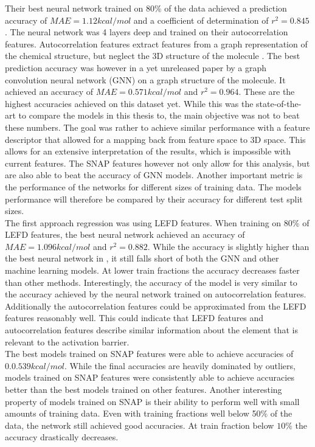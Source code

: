 Their best neural network trained on 80\% of the data achieved a prediction accuracy of $MAE = 1.12 kcal/mol$ and a 
coefficient of determination of $r^2 = 0.845$.
The neural network was 4 layers deep and trained on their autocorrelation features.
Autocorrelation features extract features from a graph representation of the chemical structure, but neglect the 
3D structure of the molecule \cite{friederich_dos}.
The best prediction accuracy was however in a yet unreleased paper by  a graph convolution neural network (GNN) on 
a graph structure of the molecule.
It achieved an accuracy of $MAE = 0.571 kcal/mol$ and $r^2=0.964$.
These are the highest accuracies achieved on this dataset yet.
While this was the state-of-the-art  to compare the models in this thesis to, the main objective was not to beat these numbers.
The goal was rather to achieve similar performance with a feature descriptor that allowed for a mapping back from feature space to 3D space.
This allows for an extensive interpretation of the results, which is impossible with current features.
The SNAP features however not only allow for this analysis, but are also able to beat the accuracy of GNN models.
Another important metric is the performance of the networks for different sizes of training data.
The models performance will therefore be compared by their accuracy for different test split sizes.
\\
The first approach regression was using LEFD features.
When training on 80\% of LEFD features, the best neural network achieved an accuracy of $MAE = 1.096 kcal/mol$ and $r^2=0.882$.
While the accuracy is slightly higher than the best neural network in \cite{friederich_dos}, it still falls short 
of both the GNN and other machine learning models.
At lower train fractions the accuracy decreases faster than other methods.
Interestingly, the accuracy of the model is very similar to the accuracy achieved by the neural network trained on autocorrelation 
features.
Additionally the autocorrelation features could be approximated from the LEFD features reasonably well.
This could indicate that LEFD features and autocorrelation features describe
similar information about the element that is relevant to the activation barrier. %
\\
The best models trained on SNAP features were able to achieve accuracies of $0.0.539 kcal/mol$.
While the final accuracies are heavily dominated by outliers, models trained on SNAP features were consistently
able to achieve accuracies better than the best models trained on other features.
Another interesting property of models trained on SNAP is their ability to perform well with small amounts 
of training data.
Even with training fractions well below 50\% of the data, the network still achieved good accuracies.
At train fraction below $10\%$ the accuracy drastically decreases.

